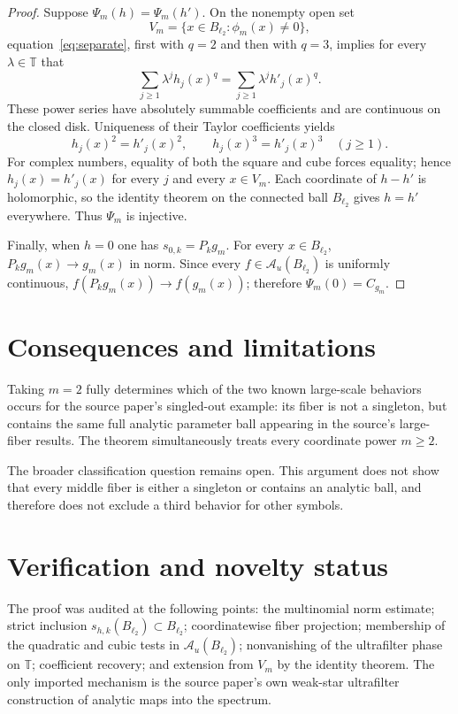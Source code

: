 \documentclass[11pt]{article}
\newcommand{\A}{\mathcal A}
\newcommand{\B}{B_{\ell_2}}
\newcommand{\T}{\mathbb T}
\begin{document}
\begin{proof}
Suppose $\Psi_m(h)=\Psi_m(h')$.  On the nonempty open set
\[
 V_m=\{x\in\B:\phi_m(x)\ne0\},
\]
equation~\eqref{eq:separate}, first with $q=2$ and then with $q=3$, implies
for every $\lambda\in\T$ that
\[
 \sum_{j\ge1}\lambda^j h_j(x)^q
 =\sum_{j\ge1}\lambda^j h'_j(x)^q.
\]
These power series have absolutely summable coefficients and are continuous
on the closed disk.  Uniqueness of their Taylor coefficients yields
\[
 h_j(x)^2=h'_j(x)^2,
 \qquad h_j(x)^3=h'_j(x)^3
 \quad(j\ge1).
\]
For complex numbers, equality of both the square and cube forces equality;
hence $h_j(x)=h'_j(x)$ for every $j$ and every $x\in V_m$.  Each coordinate
of $h-h'$ is holomorphic, so the identity theorem on the connected ball
$\B$ gives $h=h'$ everywhere.  Thus $\Psi_m$ is injective.

Finally, when $h=0$ one has $s_{0,k}=P_kg_m$.  For every $x\in\B$,
$P_kg_m(x)\to g_m(x)$ in norm.  Since every $f\in\A_u(\B)$ is uniformly
continuous, $f(P_kg_m(x))\to f(g_m(x))$; therefore
$\Psi_m(0)=C_{g_m}$.
\end{proof}

\section{Consequences and limitations}

Taking $m=2$ fully determines which of the two known large-scale behaviors
occurs for the source paper's singled-out example: its fiber is not a
singleton, but contains the same full analytic parameter ball appearing in
the source's large-fiber results.  The theorem simultaneously treats every
coordinate power $m\ge2$.

The broader classification question remains open.  This argument does not
show that every middle fiber is either a singleton or contains an analytic
ball, and therefore does not exclude a third behavior for other symbols.

\section{Verification and novelty status}

The proof was audited at the following points: the multinomial norm estimate;
strict inclusion $s_{h,k}(\B)\subset\B$; coordinatewise fiber projection;
membership of the quadratic and cubic tests in $\A_u(\B)$; nonvanishing of
the ultrafilter phase on $\T$; coefficient recovery; and extension from
$V_m$ by the identity theorem.  The only imported mechanism is the source
paper's own weak-star ultrafilter construction of analytic maps into the
spectrum.
\end{document}
